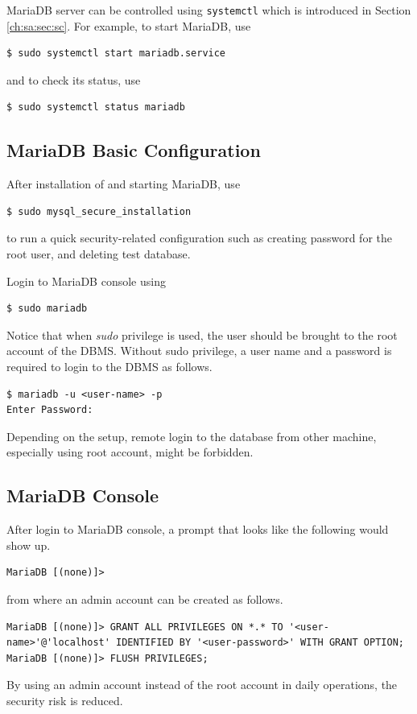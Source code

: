 MariaDB server can be controlled using \verb|systemctl| which is introduced in Section \ref{ch:sa:sec:sc}. For example, to start MariaDB, use
\begin{lstlisting}
$ sudo systemctl start mariadb.service
\end{lstlisting}
and to check its status, use
\begin{lstlisting}
$ sudo systemctl status mariadb
\end{lstlisting}

\subsection{MariaDB Basic Configuration}

After installation of and starting MariaDB, use
\begin{lstlisting}
$ sudo mysql_secure_installation
\end{lstlisting}
to run a quick security-related configuration such as creating password for the root user, and deleting test database.

Login to MariaDB console using
\begin{lstlisting}
$ sudo mariadb
\end{lstlisting}
Notice that when \textit{sudo} privilege is used, the user should be brought to the root account of the DBMS. Without sudo privilege, a user name and a password is required to login to the DBMS as follows.
\begin{lstlisting}
$ mariadb -u <user-name> -p
Enter Password:
\end{lstlisting}
Depending on the setup, remote login to the database from other machine, especially using root account, might be forbidden.

\subsection{MariaDB Console}

After login to MariaDB console, a prompt that looks like the following would show up.
\begin{lstlisting}
MariaDB [(none)]>
\end{lstlisting}
from where an admin account can be created as follows.
\begin{lstlisting}
MariaDB [(none)]> GRANT ALL PRIVILEGES ON *.* TO '<user-name>'@'localhost' IDENTIFIED BY '<user-password>' WITH GRANT OPTION;
MariaDB [(none)]> FLUSH PRIVILEGES;
\end{lstlisting}
By using an admin account instead of the root account in daily operations, the security risk is reduced.

